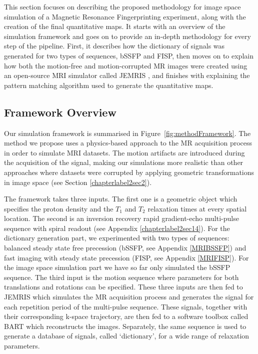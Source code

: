 
This section focuses on describing the proposed methodology for image space simulation of a Magnetic Resonance Fingerprinting experiment, along with the creation of the final quantitative maps.
It starts with an overview of the simulation framework and goes on to provide an in-depth methodology for every step of the pipeline.
First, it describes how the dictionary of signals was generated for two types of sequences, bSSFP and FISP, 
then moves on to explain how both the motion-free and motion-corrupted MR images were created using an open-source MRI simulator called JEMRIS \cite{Stocker2010},
and finishes with explaining the pattern matching algorithm used to generate the quantitative maps.

\subsection{Framework Overview}
\label{method:overview}

Our simulation framework is summarised in Figure~\ref{fig:methodFramework}.
The method we propose uses a physics-based approach to the MR acquisition process in order to simulate MRI datasets.
The motion artifacts are introduced during the acquisition of the signal, making our simulations more realistic than other approaches where datasets were corrupted by applying geometric transformations in image space (see Section \ref{chapterlabel2sec2}).

\hfill

The framework takes three inputs.
The first one is a geometric object which specifies the proton density and the $T_1$ and $T_2$ relaxation times at every spatial location.
The second is an inversion recovery rapid gradient-echo multi-pulse sequence with spiral readout (see Appendix \ref{chapterlabel2sec14}). 
For the dictionary generation part, we experimented with two types of sequences: balanced steady state free precession (bSSFP, see Appendix \ref{MRIBSSFP}) and fast imaging with steady state precession (FISP, see Appendix \ref{MRIFISP}).
For the image space simulation part we have so far only simulated the bSSFP sequence.
The third input is the motion sequence where parameters for both translations and rotations can be specified.
These three inputs are then fed to JEMRIS which simulates the MR acquisition process and generates the signal for each repetition period of the multi-pulse sequence.
These signals, together with their corresponding k-space trajectory, are then fed to a software toolbox called BART \cite{Lustig2016} which reconstructs the images.
Separately, the same sequence is used to generate a database of signals, called `dictionary', for a wide range of relaxation parameters.

